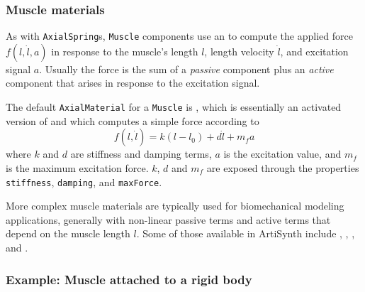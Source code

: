 \subsubsection{Muscle materials}
\label{sec:mechii:musclematerials}

As with {\tt AxialSpring}s, {\tt Muscle} components use an
 to compute the
applied force $f (l, \dot l, a)$ in response to the muscle's length
$l$, length velocity $\dot l$, and excitation signal $a$.  Usually the
force is the sum of a {\it passive} component plus an {\it active}
component that arises in response to the excitation signal.

The default {\tt AxialMaterial} for a {\tt Muscle} is
,
which is essentially an activated version of 
and 
which computes a simple force according to
%
\begin{equation}
f(l, \dot l) = k (l-l_0) + d \dot l + m_f a
\end{equation}
%
where $k$ and $d$ are stiffness and damping terms, $a$ is the
excitation value, and $m_f$ is the maximum excitation force.
$k$, $d$ and $m_f$ are exposed through the properties {\tt
stiffness}, {\tt damping}, and {\tt maxForce}.

More complex muscle materials are typically used for biomechanical
modeling applications, generally with non-linear passive terms and
active terms that depend on the muscle length $l$.  Some of those
available in ArtiSynth include
,
,
, and
.


\subsubsection{Example: Muscle attached to a rigid body}
\label{SimpleMuscleExample:sec}

